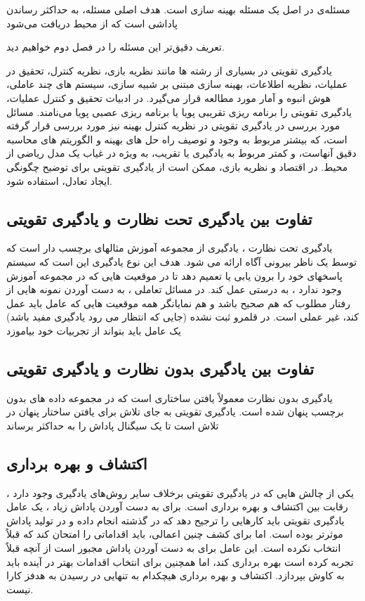 مسئله‌ی  در اصل یک مسئله بهینه سازی است. هدف اصلی مسئله، به حداکثر رساندن پاداشی است که از محیط دریافت می‌شود

تعریف دقیق‌تر این مسئله را در فصل دوم خواهیم دید.

یادگیری تقویتی
در بسیاری از رشته ها مانند نظریه بازی، نظریه کنترل، تحقیق در عملیات، نظریه اطلاعات، بهینه سازی مبتنی بر شبیه سازی، سیستم های چند عاملی، هوش انبوه و آمار مورد مطالعه قرار می‌گیرد. در ادبیات تحقیق و کنترل عملیات، یادگیری تقویتی را برنامه ریزی تقریبی پویا   یا برنامه ریزی عصبی پویا   می‌نامند. مسائل مورد بررسی در یادگیری تقویتی در نظریه کنترل بهینه  نیز مورد بررسی قرار گرفته است، که بیشتر مربوط به وجود و توصیف راه حل های بهینه و الگوریتم های محاسبه دقیق آنهاست، و کمتر مربوط به یادگیری یا تقریب، به ویژه در غیاب یک مدل ریاضی از محیط. در اقتصاد و نظریه بازی، ممکن است از یادگیری تقویتی برای توضیح چگونگی ایجاد تعادل، استفاده شود.


\subsection{تفاوت بین یادگیری تحت نظارت و یادگیری تقویتی}
یادگیری تحت نظارت ، یادگیری از مجموعه آموزش مثالهای برچسب دار است که توسط یک ناظر بیرونی آگاه ارائه می شود. هدف این نوع یادگیری این است که سیستم پاسخهای خود را برون یابی یا تعمیم دهد تا در موقعیت هایی که در مجموعه آموزش وجود ندارد ، به درستی عمل کند. در مسائل تعاملی ، به دست آوردن نمونه هایی از رفتار مطلوب که هم صحیح باشد و هم نمایانگر همه موقعیت هایی که عامل باید عمل کند، غیر عملی است. در قلمرو ثبت نشده (جایی که انتظار می رود یادگیری مفید باشد) یک عامل باید بتواند از تجربیات خود بیاموزد

\subsection{تفاوت بین یادگیری بدون نظارت و یادگیری تقویتی}
یادگیری بدون نظارت معمولاً یافتن ساختاری است که در مجموعه داده های بدون برچسب پنهان شده است. یادگیری تقویتی به جای تلاش برای یافتن ساختار پنهان در تلاش است تا یک سیگنال پاداش را به حداکثر برساند

\subsection{اکتشاف و بهره برداری}
یکی از چالش هایی که در یادگیری تقویتی برخلاف سایر روش‌های یادگیری وجود دارد ، رقابت بین اکتشاف و بهره برداری است. برای به دست آوردن پاداش زیاد ، یک عامل یادگیری تقویتی باید کارهایی را ترجیح دهد که در گذشته انجام داده و در تولید پاداش موثرتر بوده است. اما برای کشف چنین اعمالی، باید اقداماتی را امتحان کند که قبلاً انتخاب نکرده است. این عامل برای به دست آوردن پاداش مجبور است از آنچه قبلاً تجربه کرده است بهره برداری کند، اما همچنین برای انتخاب اقدامات بهتر در آینده باید به کاوش بپردازد. 
اکتشاف و بهره برداری هیچکدام به تنهایی در رسیدن به هدفز کارا نیست.
